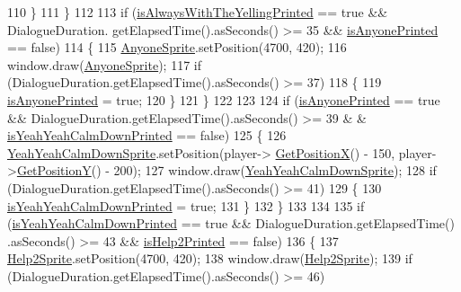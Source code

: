 \begin{DoxyCode}
110             \}
111         \}
112 
113         \textcolor{keywordflow}{if} (\hyperlink{classDialogue_a068902d456ee99ed23d2849d4e66a917}{isAlwaysWithTheYellingPrinted} == \textcolor{keyword}{true} && DialogueDuration.
      getElapsedTime().asSeconds() >= 35 && \hyperlink{classDialogue_a8900da2be3d702f726678a32404f0258}{isAnyonePrinted} == \textcolor{keyword}{false})
114         \{
115             \hyperlink{classDialogue_a0c7cabd989d3b5afacfc0c277dd3967d}{AnyoneSprite}.setPosition(4700, 420);
116             window.draw(\hyperlink{classDialogue_a0c7cabd989d3b5afacfc0c277dd3967d}{AnyoneSprite});
117             \textcolor{keywordflow}{if} (DialogueDuration.getElapsedTime().asSeconds() >= 37)
118             \{
119                \hyperlink{classDialogue_a8900da2be3d702f726678a32404f0258}{isAnyonePrinted} = \textcolor{keyword}{true};
120             \}
121         \}
122 
123 
124         \textcolor{keywordflow}{if} (\hyperlink{classDialogue_a8900da2be3d702f726678a32404f0258}{isAnyonePrinted} == \textcolor{keyword}{true} && DialogueDuration.getElapsedTime().asSeconds() >= 39 &
      & \hyperlink{classDialogue_af4b000d93c07ec502f6d2e345e4d1099}{isYeahYeahCalmDownPrinted} == \textcolor{keyword}{false})
125         \{
126             \hyperlink{classDialogue_ad95300bae2b0ffbd0f104c1450a47f10}{YeahYeahCalmDownSprite}.setPosition(player->
      \hyperlink{classPlayerObject_aa84a7779304b680fa32b88b01ba95d02}{GetPositionX}() - 150, player->\hyperlink{classPlayerObject_ad17b9ec44299f4dc9ca20064c883496b}{GetPositionY}() - 200);
127             window.draw(\hyperlink{classDialogue_ad95300bae2b0ffbd0f104c1450a47f10}{YeahYeahCalmDownSprite});
128             \textcolor{keywordflow}{if} (DialogueDuration.getElapsedTime().asSeconds() >= 41)
129             \{
130                \hyperlink{classDialogue_af4b000d93c07ec502f6d2e345e4d1099}{isYeahYeahCalmDownPrinted} = \textcolor{keyword}{true};
131             \}
132         \}
133 
134 
135         \textcolor{keywordflow}{if} (\hyperlink{classDialogue_af4b000d93c07ec502f6d2e345e4d1099}{isYeahYeahCalmDownPrinted} == \textcolor{keyword}{true} && DialogueDuration.getElapsedTime()
      .asSeconds() >= 43 && \hyperlink{classDialogue_ad2233869defe9632464912f8ebc0d1e8}{isHelp2Printed} == \textcolor{keyword}{false})
136         \{
137             \hyperlink{classDialogue_aaab7a032364f62e4f39b0082fff4cd4d}{Help2Sprite}.setPosition(4700, 420);
138             window.draw(\hyperlink{classDialogue_aaab7a032364f62e4f39b0082fff4cd4d}{Help2Sprite});
139             \textcolor{keywordflow}{if} (DialogueDuration.getElapsedTime().asSeconds() >= 46)

\end{DoxyCode}
